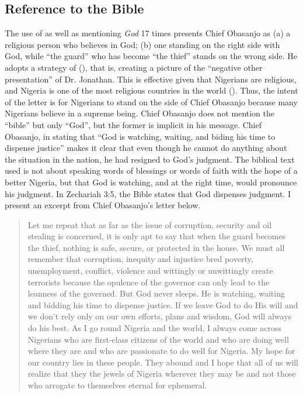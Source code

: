 \documentclass[output=paper,colorlinks,citecolor=brown]{langscibook}
\begin{document}
\subsection{Reference to the Bible}

The use of  as well as mentioning \textit{God} 17 times presents Chief Obasanjo as (a) a religious person who believes in God; (b) one standing on the right side with God, while “the guard” who has become “the thief” stands on the wrong side. He adopts a strategy of  (\cite[47]{Chilton2004}), that is, creating a picture of the “negative other presentation” of Dr. Jonathan. This is effective given that Nigerians are religious, and Nigeria is one of the most religious countries in the world (\cite{Nag2018}). Thus, the intent of the letter is for Nigerians to stand on the side of Chief Obasanjo because many Nigerians believe in a supreme being. Chief Obasanjo does not mention the “bible” but only “God”, but the former is implicit in his message. Chief Obasanjo, in stating that “God is watching, waiting, and biding his time to dispense justice” makes it clear that even though he cannot do anything about the situation in the nation, he had resigned to God’s judgment. The biblical text  used is not about speaking words of blessings or words of faith with the hope of a better Nigeria, but that God is watching, and at the right time, would pronounce his judgment. In Zechariah 3:5, the Bible states that God dispenses judgment. I present an excerpt from Chief Obasanjo’s letter below. 

\begin{quote}
    Let me repeat that as far as the issue of corruption, security and oil stealing is concerned, it is only apt to say that when the guard becomes the thief, nothing is safe, secure, or protected in the house. We must all remember that corruption, inequity and injustice bred poverty, unemployment, conflict, violence and wittingly or unwittingly create terrorists because the opulence of the governor can only lead to the leanness of the governed. But God never sleeps. He is watching, waiting and bidding his time to dispense justice. If we leave God to do His will and we don’t rely only on our own efforts, plans and wisdom, God will always do his best. As I go round Nigeria and the world, I always come across Nigerians who are first-class citizens of the world and who are doing well where they are and who are passionate to do well for Nigeria. My hope for our country lies in these people. They abound and I hope that all of us will realize that they the jewels of Nigeria wherever they may be and not those who arrogate to themselves eternal for ephemeral.
\end{quote}
\end{document}

